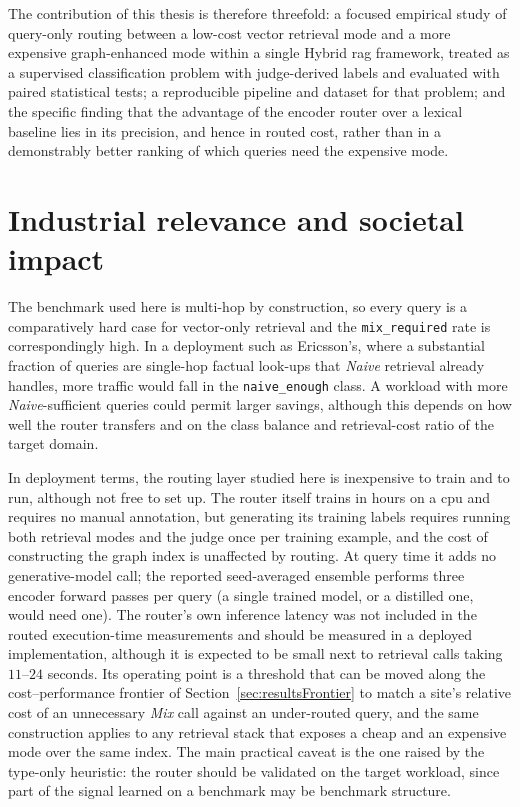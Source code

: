 \documentclass[english, bibtex]{kththesis}               %
\numberwithin{listing}{chapter}
\begin{document}
The contribution of this thesis is therefore threefold: a focused empirical study of query-only routing between a low-cost vector retrieval mode and a more expensive graph-enhanced mode within a single Hybrid \gls{rag} framework, treated as a supervised classification problem with judge-derived labels and evaluated with paired statistical tests; a reproducible pipeline and dataset for that problem; and the specific finding that the advantage of the encoder router over a lexical baseline lies in its precision, and hence in routed cost, rather than in a demonstrably better ranking of which queries need the expensive mode.

\section{Industrial relevance and societal impact}
\label{sec:discIndustrial}

The benchmark used here is multi-hop by construction, so every query is a comparatively hard case for vector-only retrieval and the \texttt{mix\_required} rate is correspondingly high. In a deployment such as Ericsson's, where a substantial fraction of queries are single-hop factual look-ups that \emph{Naive} retrieval already handles, more traffic would fall in the \texttt{naive\_enough} class. A workload with more \emph{Naive}-sufficient queries could permit larger savings, although this depends on how well the router transfers and on the class balance and retrieval-cost ratio of the target domain.

In deployment terms, the routing layer studied here is inexpensive to train and to run, although not free to set up. The router itself trains in hours on a \gls{cpu} and requires no manual annotation, but generating its training labels requires running both retrieval modes and the judge once per training example, and the cost of constructing the graph index is unaffected by routing. At query time it adds no generative-model call; the reported seed-averaged ensemble performs three encoder forward passes per query (a single trained model, or a distilled one, would need one). The router's own inference latency was not included in the routed execution-time measurements and should be measured in a deployed implementation, although it is expected to be small next to retrieval calls taking $11$--$24$ seconds. Its operating point is a threshold that can be moved along the cost--performance frontier of Section~\ref{sec:resultsFrontier} to match a site's relative cost of an unnecessary \emph{Mix} call against an under-routed query, and the same construction applies to any retrieval stack that exposes a cheap and an expensive mode over the same index. The main practical caveat is the one raised by the type-only heuristic: the router should be validated on the target workload, since part of the signal learned on a benchmark may be benchmark structure.
\end{document}
